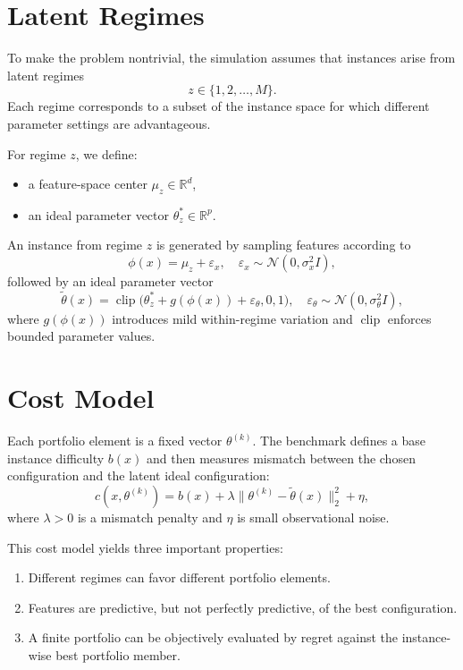 \documentclass[11pt]{report}
\begin{document}
\section{Latent Regimes}

To make the problem nontrivial, the simulation assumes that instances arise from latent regimes
\[
z \in \{1,2,\dots,M\}.
\]
Each regime corresponds to a subset of the instance space for which different parameter settings are advantageous.

For regime $z$, we define:
\begin{itemize}[leftmargin=2em]
\item a feature-space center $\mu_z \in \mathbb{R}^d$,
\item an ideal parameter vector $\theta_z^* \in \mathbb{R}^p$.
\end{itemize}

An instance from regime $z$ is generated by sampling features according to
\[
\phi(x) = \mu_z + \varepsilon_x,
\quad
\varepsilon_x \sim \mathcal{N}(0, \sigma_x^2 I),
\]
followed by an ideal parameter vector
\[
\tilde{\theta}(x) = \operatorname{clip}\bigl(\theta_z^* + g(\phi(x)) + \varepsilon_\theta, 0, 1\bigr),
\quad
\varepsilon_\theta \sim \mathcal{N}(0, \sigma_\theta^2 I),
\]
where $g(\phi(x))$ introduces mild within-regime variation and $\operatorname{clip}$ enforces bounded parameter values.

\section{Cost Model}

Each portfolio element is a fixed vector $\theta^{(k)}$. The benchmark defines a base instance difficulty $b(x)$ and then measures mismatch between the chosen configuration and the latent ideal configuration:
\[
c(x, \theta^{(k)}) = b(x) + \lambda \lVert \theta^{(k)} - \tilde{\theta}(x) \rVert_2^2 + \eta,
\]
where $\lambda > 0$ is a mismatch penalty and $\eta$ is small observational noise.

This cost model yields three important properties:
\begin{enumerate}[leftmargin=2em]
\item Different regimes can favor different portfolio elements.
\item Features are predictive, but not perfectly predictive, of the best configuration.
\item A finite portfolio can be objectively evaluated by regret against the instance-wise best portfolio member.
\end{enumerate}
\end{document}
